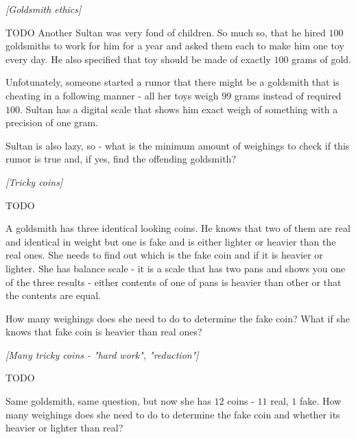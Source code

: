 

%


\noindent 

\begin{problem}
\textit{[Goldsmith ethics]}

TODO 
Another Sultan was very fond of children. So much so, that he hired $100$ goldsmiths to work for him for a year and asked them each to make him one toy every day. He also specified that toy should be made of exactly $100$ grams of gold.

Unfotunately, someone started a rumor that there might be a goldsmith that is cheating in a following manner - all her toys weigh $99$ grams instead of required $100$. Sultan has a digital scale that shows him exact weigh of something with a precision of one gram. 

Sultan is also lazy, so - what is the minimum amount of weighings to check if this rumor is true and, if yes, find the offending goldsmith?
\end{problem}
%

\begin{problem}
\textit{[Tricky coins]}

TODO

A goldsmith has three identical looking coins. He knows that two of them are real and identical in weight but one is fake and is either lighter or heavier than the real ones. She needs to find out which is the fake coin and if it is heavier or lighter.
She has balance scale - it is a scale that has two pans and shows you one of the three results - either contents of one of pans is heavier than other or that the contents are equal.

How many weighings does she need to do to determine the fake coin? What if she knows that fake coin is heavier than real ones?
\end{problem}
%

\begin{problem}
\textit{[Many tricky coins - "hard work", "reduction"]}

TODO 

Same goldsmith, same question, but now she has $12$ coins - $11$ real, $1$ fake.
How many weighings does she need to do to determine the fake coin and whether its heavier or lighter than real? 
\end{problem}
%


